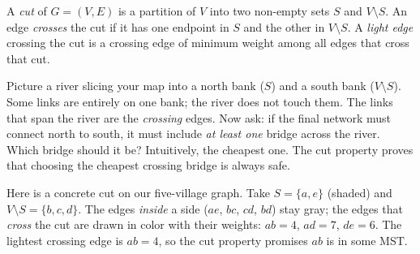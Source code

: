 \begin{definition}\label{ch23:def-cut}
A \emph{cut} of $G=(V,E)$ is a partition of $V$ into two non-empty sets $S$ and
$V\setminus S$. An edge \emph{crosses} the cut if it has one endpoint in $S$ and
the other in $V\setminus S$. A \emph{light edge} crossing the cut is a crossing
edge of minimum weight among all edges that cross that cut.
\end{definition}

\begin{intuitionbox}
Picture a river slicing your map into a north bank ($S$) and a south bank
($V\setminus S$). Some links are entirely on one bank; the river does not touch
them. The links that span the river are the \emph{crossing} edges. Now ask: if
the final network must connect north to south, it must include \emph{at least
one} bridge across the river. Which bridge should it be? Intuitively, the
cheapest one. The cut property proves that choosing the cheapest crossing bridge
is always safe.
\end{intuitionbox}

Here is a concrete cut on our five-village graph. Take $S = \{a, e\}$ (shaded)
and $V \setminus S = \{b, c, d\}$. The edges \emph{inside} a side ($ae$, $bc$,
$cd$, $bd$) stay gray; the edges that \emph{cross} the cut are drawn in color
with their weights: $ab{=}4$, $ad{=}7$, $de{=}6$. The lightest crossing edge is
$ab{=}4$, so the cut property promises $ab$ is in some MST.

\begin{center}
\end{center}

